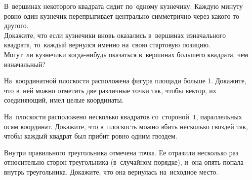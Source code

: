 


\begin{problems}

\item
В~вершинах некоторого квадрата сидит по~одному кузнечику.
Каждую минуту ровно один кузнечик перепрыгивает центрально-симметрично через
какого-то другого.
\\
\subproblem
Докажите, что если кузнечики вновь оказались в~вершинах изначального квадрата,
то~каждый вернулся именно на~свою стартовую позицию.
\\
\subproblem
Могут~ли кузнечики когда-нибудь оказаться в~вершинах большего квадрата, чем
изначальный?



\item
На~координатной плоскости расположена фигура площади больше 1.
Докажите, что в~ней можно отметить две различные точки так, чтобы вектор, их
соединяющий, имел целые координаты.

\item
На~плоскости расположено несколько квадратов со~стороной~$1$, параллельных осям
координат.
Докажите, что в~плоскость можно вбить несколько гвоздей так, чтобы каждый
квадрат был прибит ровно одним гвоздем.


\item
Внутри правильного треугольника отмечена точка.
Ее отразили несколько раз относительно сторон треугольника
(в~случайном порядке), и~она опять попала внутрь треугольника.
Докажите, что она вернулась на~исходное место.


\end{problems}
